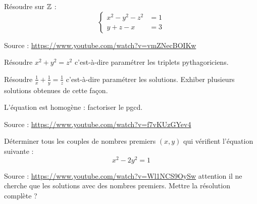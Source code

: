 \begin{exo}[Nontesté]
Résoudre sur $\mathbb Z$ : 
\[ \begin{cases}
x^2-y^2-z^2 &=1\\
y+z-x&=3
\end{cases}\]
\begin{hint}
\end{hint}
\begin{sol}
Source : \url{https://www.youtube.com/watch?v=vmZNecBOIKw}

\end{sol}
\end{exo}


\begin{exo}
\begin{hint}
\end{hint}
\begin{sol}
\end{sol}
\end{exo}


\begin{exo}
\begin{hint}
\end{hint}
\begin{sol}
\end{sol}
\end{exo}




\begin{exo}
Résoudre $x^2+y^2=z^2$ c'est-à-dire paramétrer les triplets pythagoriciens.
\begin{hint}
\end{hint}
\begin{sol}
\end{sol}
\end{exo}


\begin{exo}
Résoudre $\frac1x+\frac1y = \frac1z$ c'est-à-dire paramétrer les  solutions. Exhiber plusieurs solutions obtenues de cette façon.
\begin{hint}
L'équation est homogène : factoriser le pgcd.
\end{hint}
\begin{sol}
Source : \url{https://www.youtube.com/watch?v=f7vKUzGYev4}
\end{sol}
\end{exo}


\begin{exo}
Déterminer tous les couples de nombres premiers $(x,y)$ qui vérifient l'équation suivante : 
\[ x^2-2y^2 = 1\]
\begin{hint}
\end{hint}
\begin{sol}
Source : \url{https://www.youtube.com/watch?v=Wl1NCS9OySw} attention il ne cherche que les solutions avec des nombres premiers.
Mettre la résolution complète ?
\end{sol}
\end{exo}



\begin{exo}
\begin{hint}
\end{hint}
\begin{sol}
\end{sol}
\end{exo}



\indications
\correction




